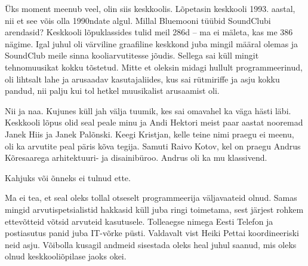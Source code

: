 Üks moment meenub veel, olin siis keskkoolis. 
Lõpetasin keskkooli 1993. aastal, nii et see võis olla 1990ndate algul. Millal 
Bluemooni tüübid SoundClubi arendasid? Keskkooli lõpuklassides 
tulid meil 286d -- ma ei mäleta, kas me 386 nägime. 
Igal juhul oli värviline graafiline keskkond juba mingil määral olemas ja 
SoundClub meile sinna kooliarvutitesse jõudis. Sellega sai küll mingit 
tehnomuusikat kokku tõstetud. Mitte et oleksin midagi hullult programmeerinud, oli lihtsalt lahe ja arusaadav kasutajaliides, kus sai
rütmiriffe ja asju kokku pandud, nii palju kui tol hetkel 
muusikalist arusaamist oli.


Nii ja naa. Kujunes küll jah välja tuumik, kes sai omavahel ka väga 
hästi läbi. Keskkooli lõpus olid seal peale 
minu ja Andi Hektori meist paar aastat 
nooremad Janek Hiis ja Janek 
Palõnski. Keegi Kristjan, kelle teine 
nimi praegu ei meenu, oli ka arvutite peal päris kõva tegija. Samuti Raivo 
Kotov, kel on praegu Andrus 
Kõresaarega arhitektuuri- ja 
disainibüroo. Andrus oli ka mu klassivend.


Kahjuks või õnneks ei tulnud ette. 


Ma ei tea, et seal oleks tollal otseselt programmeerija väljavaateid 
olnud. Samas mingid arvutispetsialistid hakkasid küll juba ringi 
toimetama, sest järjest rohkem ettevõtteid võtsid arvuteid kasutusele. Tolleaegse nimega 
Eesti Telefon ja postiasutus panid juba IT-võrke püsti. Valdavalt vist Heiki 
Pettai koordineeriski neid asju. Võibolla kusagil andmeid sisestada oleks 
heal juhul saanud, mis oleks olnud keskkooliõpilase jaoks okei. 

